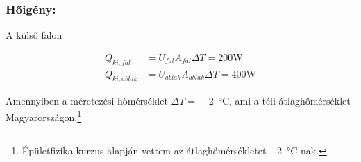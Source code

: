 \subsubsection*{Hőigény:}

A külső falon

\begin{equation}\label{eq_hoigeny}
\begin{aligned}
		Q_{ki,fal} &= U_{fal}A_{fal}\Delta T = 200\si{\watt}\\[10pt]
		Q_{ki,ablak} &= U_{ablak}A_{ablak}\Delta T = 400\si{\watt}
\end{aligned}
\end{equation}

Amennyiben a méretezési hőmérséklet $\Delta T=$ \SI{-2}{\celsius}, ami a téli átlaghőmérséklet Magyarországon.\footnote{Épületfizika kurzus alapján vettem az átlaghőmérsékletet \SI{-2}{\celsius}-nak.}








%
%
%

